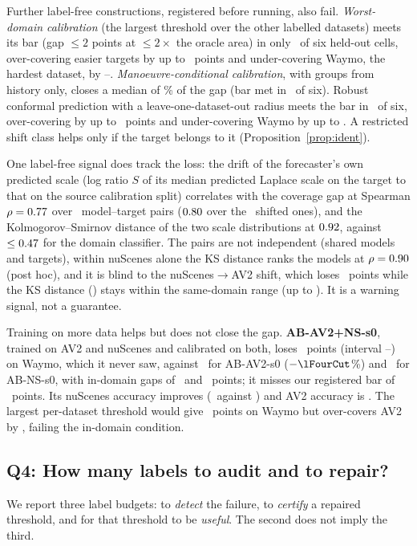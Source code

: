 Further label-free constructions, registered before running, also fail. \emph{Worst-domain calibration} (the largest threshold
over the other labelled datasets) meets its bar (gap $\le2$ points at $\le2\times$ the oracle area) in only \abAok\ of six
held-out cells, over-covering easier targets by up to \abEasyOverMax\ points and under-covering Waymo, the hardest dataset, by
\abWmGapMin--\abWmGapMax. \emph{Manoeuvre-conditional calibration}, with groups from history only, closes a median of \abBRedMed\%
of the gap (bar met in \abBok\ of six). Robust conformal prediction \cite{cauchois2024robust} with a leave-one-dataset-out
radius meets the bar in \robOk\ of six, over-covering by up to \robOverMax\ points and under-covering Waymo by up to \robUnderMax.
A restricted shift class helps only if the target belongs to it (Proposition~\ref{prop:ident}).

One label-free signal does track the loss: the drift of the forecaster's own predicted scale (log ratio $S$ of its median
predicted Laplace scale on the target to that on the source calibration split) correlates with the coverage gap at Spearman
$\rho=0.77$ over \monN\ model--target pairs ($0.80$ over the \monNShift\ shifted ones), and the Kolmogorov--Smirnov
distance of the two scale distributions at $0.92$, against $\le0.47$ for the domain classifier. The pairs are not
independent (shared models and targets), within nuScenes alone the KS distance ranks the models at $\rho=0.90$ (post
hoc), and it is blind to the nuScenes$\to$AV2 shift, which loses \monBlindGap\ points while the KS distance (\monBlindKS) stays
within the same-domain range (up to \monSameKSMax). It is a warning signal, not a guarantee.

Training on more data helps but does not close the gap. \textbf{AB-AV2+NS-s0}, trained on AV2 and nuScenes and calibrated on both,
loses \lFourWm\ points (interval \lFourWmLo--\lFourWmHi) on Waymo, which it never saw, against \lFourRefAv\ for AB-AV2-s0
($-\lFourCut$\%) and \lFourRefNs\ for AB-NS-s0, with in-domain gaps of \lFourAv\ and \lFourNs\ points; it misses our registered
bar of \lFourBar\ points. Its nuScenes accuracy improves (\lFourAdeNs\ against \minADESixConfRev) and AV2 accuracy is \lFourAdeAv.
The largest per-dataset threshold would give \lFourWd\ points on Waymo but over-covers AV2 by \lFourWdAv, failing the in-domain condition.

\subsection{Q4: How many labels to audit and to repair?}\label{sec:repair-scene}
We report three label budgets: to \emph{detect} the failure, to \emph{certify} a repaired threshold, and for that
threshold to be \emph{useful}. The second does not imply the third.


